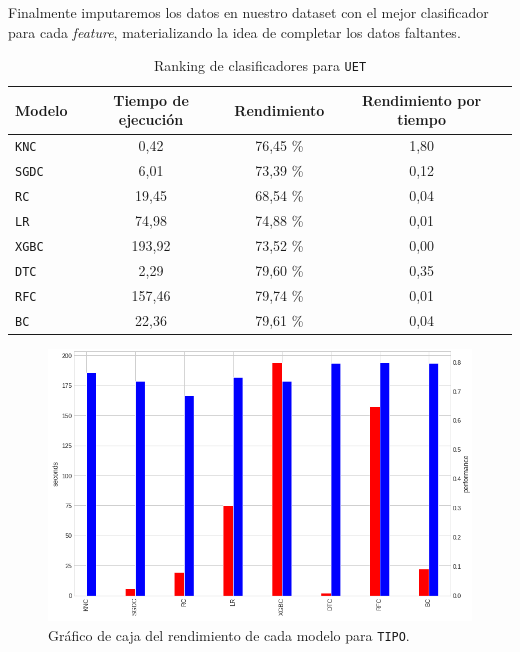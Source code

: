 \documentclass[a4paper,12pt]{article}
\begin{document}
Finalmente imputaremos los datos en nuestro dataset con el mejor clasificador para cada \textit{feature}, materializando la idea de completar los datos faltantes.

\begin{table}[H]
\centering
\begin{tabular}{lccc}
\textbf{Modelo} & \textbf{Tiempo de ejecución} & \textbf{Rendimiento} & \textbf{Rendimiento por tiempo} \\ \hline
\texttt{KNC}  & 0,42   & 76,45 \% & 1,80 \\
\texttt{SGDC} & 6,01   & 73,39 \% & 0,12 \\
\texttt{RC}   & 19,45  & 68,54 \% & 0,04 \\
\texttt{LR}   & 74,98  & 74,88 \% & 0,01 \\
\texttt{XGBC} & 193,92 & 73,52 \% & 0,00 \\
\texttt{DTC}  & 2,29   & 79,60 \% & 0,35 \\
\texttt{RFC}  & 157,46 & 79,74 \% & 0,01 \\
\texttt{BC}   & 22,36  & 79,61 \% & 0,04
\end{tabular}
\caption{Ranking de clasificadores para \texttt{UET}}
\label{tab:ranking-uet-table}
\end{table}

\begin{figure}[H]
	\begin{center}
	\includegraphics[width=1\textwidth]{tesis_71.png}
  	\caption{Gráfico de caja del rendimiento de cada modelo para \texttt{TIPO}.}
  	\label{fig:timesmodeluet}
  	\end{center}
\end{figure}
\end{document}
